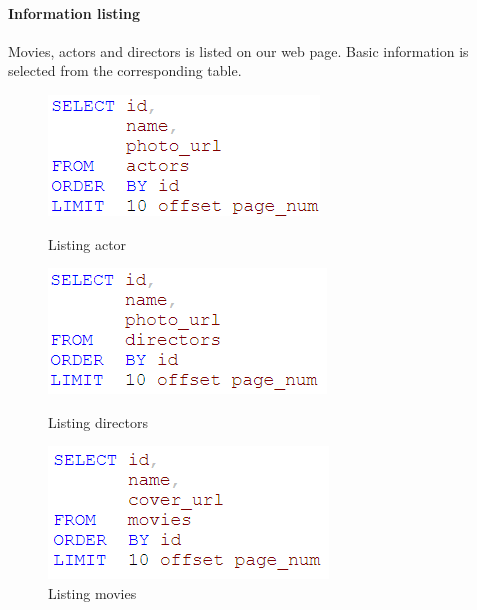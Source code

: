 \begin{CJK*}{UTF8}{gbsn}
\paragraph{Information listing}Movies, actors and directors is listed on our web page. Basic information is selected from the corresponding table.
\begin{figure}[htbp]
\centering
\begin{minipage}{0.32\textwidth}
\includegraphics[width=\linewidth]{a_list.png}
\caption{Listing actor}
\end{minipage}
\begin{minipage}{0.32\textwidth}
\includegraphics[width=\linewidth]{dir_list.png}
\caption{Listing directors}
\end{minipage}
\begin{minipage}{0.32\textwidth}
\includegraphics[width=\linewidth]{m_list.png}
\caption{Listing movies}
\end{minipage}
\end{figure}


\end{CJK*}
